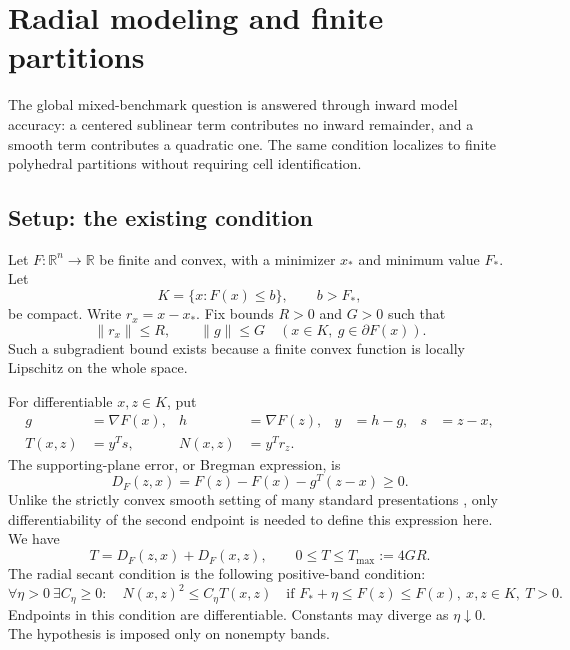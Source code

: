 \chapter{Radial modeling and finite partitions}\label{comp:R}\label{R:chapter}
\renewcommand{\ModuleTag}{4}
The global mixed-benchmark question is answered through inward model accuracy: a centered sublinear term contributes no inward remainder, and a smooth term contributes a quadratic one. The same condition localizes to finite polyhedral partitions without requiring cell identification.


\begingroup
\providecommand{\R}{}
\renewcommand{\R}{\mathbb R}
\providecommand{\ip}{}
\renewcommand{\ip}[2]{\langle #1,#2\rangle}
\providecommand{\DF}{}
\renewcommand{\DF}{D_F}
\providecommand{\st}{}
\renewcommand{\st}{x_*}
\providecommand{\fs}{}
\renewcommand{\fs}{F_*}
\makeatletter\let\c@lemma\c@theorem\let\c@corollary\c@theorem\let\c@proposition\c@theorem\let\c@remark\c@theorem\makeatother
\renewcommand{\thelemma}{\thetheorem}\renewcommand{\thecorollary}{\thetheorem}\renewcommand{\theproposition}{\thetheorem}\renewcommand{\theremark}{\thetheorem}
\renewcommand{\thetheorem}{4.\arabic{section}.\arabic{theorem}}
\setcounter{section}{0}
\setcounter{theorem}{0}
\setcounter{equation}{0}


\section{Setup: the existing condition}

Let $F:\R^n\to\R$ be finite and convex, with a minimizer $\st$ and minimum value $\fs$. Let
\[
 K=\{x:F(x)\le b\},\qquad b>\fs,
\]
be compact. Write $r_x=x-\st$. Fix bounds $R>0$ and $G>0$ such that
\[
 \|r_x\|\le R,\qquad \|g\|\le G\quad(x\in K,\ g\in\partial F(x)).
\]
Such a subgradient bound exists because a finite convex function is locally Lipschitz on the whole space.

For differentiable $x,z\in K$, put
\begin{align*}
 g&=\nabla F(x),& h&=\nabla F(z),&y&=h-g,&s&=z-x,\\
 T(x,z)&=y^Ts,&N(x,z)&=y^Tr_z.
\end{align*}
The supporting-plane error, or Bregman expression, is
\[
 \DF(z,x)=F(z)-F(x)-g^T(z-x)\ge0.
\]
Unlike the strictly convex smooth setting of many standard presentations \cite{BB}, only differentiability of the second endpoint is needed to define this expression here. We have
\[
 T=\DF(z,x)+\DF(x,z),\qquad 0\le T\le T_{\max}:=4GR.
\]
The radial secant condition is the following positive-band condition:
\begin{equation}
 \forall\eta>0\ \exists C_\eta\ge0:\quad
 N(x,z)^2\le C_\eta T(x,z)
 \quad\text{if }\fs+\eta\le F(z)\le F(x),\ x,z\in K,\ T>0.
 \tag{4.RS}\label{R:eq:RS}
\end{equation}
Endpoints in this condition are differentiable. Constants may diverge as $\eta\downarrow0$. The hypothesis is imposed only on nonempty bands.

